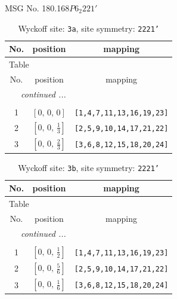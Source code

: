 \documentclass[fleqn,8pt]{jsarticle}
\begin{document}
\setcounter{MaxMatrixCols}{32}

\renewcommand{\tablename}{Table~}
\renewcommand{\figurename}{Figure~}
\begin{center}
\LARGE
MSG No. 180.168\quad$P6_{2}221'$
\end{center}
\renewcommand{\arraystretch}{1.2}
\begin{longtable}{ccc}
\caption{Wyckoff site: {\tt 3a}, site symmetry: {\tt 2221'}}
 \\
 \hline \hline
No. & position & mapping \\ \hline \endfirsthead

\multicolumn{2}{l}{\tablename\ \thetable{}} \\
 \hline \hline
No. & position & mapping \\ \hline \endhead

 \hline \hline
\multicolumn{2}{r}{\footnotesize\it continued ...} \\ \endfoot

 \hline \hline
\multicolumn{2}{r}{} \\ \endlastfoot

1 & $\left[ 0,\, 0,\, 0 \right]$ & {\tt [1,4,7,11,13,16,19,23]} \\ \hline
2 & $\left[ 0,\, 0,\, \frac{1}{3} \right]$ & {\tt [2,5,9,10,14,17,21,22]} \\ \hline
3 & $\left[ 0,\, 0,\, \frac{2}{3} \right]$ & {\tt [3,6,8,12,15,18,20,24]} \\
\end{longtable}
\renewcommand{\arraystretch}{1.2}
\begin{longtable}{ccc}
\caption{Wyckoff site: {\tt 3b}, site symmetry: {\tt 2221'}}
 \\
 \hline \hline
No. & position & mapping \\ \hline \endfirsthead

\multicolumn{2}{l}{\tablename\ \thetable{}} \\
 \hline \hline
No. & position & mapping \\ \hline \endhead

 \hline \hline
\multicolumn{2}{r}{\footnotesize\it continued ...} \\ \endfoot

 \hline \hline
\multicolumn{2}{r}{} \\ \endlastfoot

1 & $\left[ 0,\, 0,\, \frac{1}{2} \right]$ & {\tt [1,4,7,11,13,16,19,23]} \\ \hline
2 & $\left[ 0,\, 0,\, \frac{5}{6} \right]$ & {\tt [2,5,9,10,14,17,21,22]} \\ \hline
3 & $\left[ 0,\, 0,\, \frac{1}{6} \right]$ & {\tt [3,6,8,12,15,18,20,24]} \\
\end{longtable}
\end{document}
